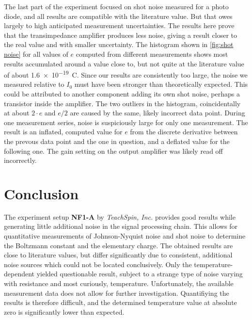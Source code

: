 \documentclass[
    parskip=half, 
    twoside=false,
    twocolumn=true,
    fontsize=11pt,
]{scrarticle}
\begin{document}
The last part of the experiment focused on shot noise measured for a photo diode, and all results are compatible with the literature value. But that owes largely to high anticipated measurement uncertainties. The results here prove that the transimpedance amplifier produces less noise, giving a result closer to the real value and with smaller uncertainty. The histogram shown in \autoref{fig:shot noise} for all values of $e$ computed from different measurements shows most results accumulated around a value close to, but not quite at the literature value of about \SI{1.6e-19}{\coulomb}. Since our results are consistently too large, the noise we measured relative to $I_0$ must have been stronger than theoretically expected. This could be attributed to another component adding its own shot noise, perhaps a transistor inside the amplifier. The two outliers in the histogram, coincidentally at about $2 \cdot e$ and $e/2$ are caused by the same, likely incorrect data point. During one measurement series, noise is suspiciously large for only one measurement. The result is an inflated, computed value for $e$ from the discrete derivative between the prevous data point and the one in question, and a deflated value for the following one. The gain setting on the output amplifier was likely read off incorrectly.

\pagebreak
\section{Conclusion}
The experiment setup \textbf{NF1-A} by \textit{TeachSpin, Inc.} provides good results while generating little additional noise in the signal processing chain. This allows for quantitative measurements of Johnson-Nyquist noise and shot noise to determine the Boltzmann constant and the elementary charge. The obtained results are close to literature values, but differ significantly due to consistent, additional noise sources which could not be located conclusively. Only the temperature-dependent yielded questionable result, subject to a strange type of noise varying with resistance and most curiously, temperature. Unfortunately, the available measurement data does not allow for further investigation. Quantifiying the results is therefore difficult, and the determined temperature value at absolute zero is significantly lower than expected.

\nocite{*}
\printbibliography
\end{document}

